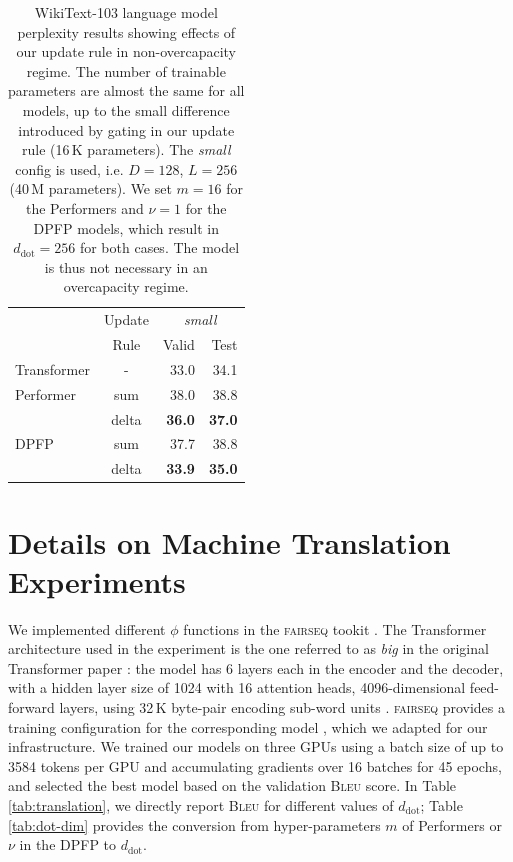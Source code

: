 \documentclass{article}
\theoremstyle{definition}
\begin{document}
\begin{table}[h]
\caption{WikiText-103 language model perplexity results
showing effects of our update rule
in non-overcapacity regime.
The number of trainable parameters are almost the same for all models,
up to the small difference introduced by gating in our update rule (16\,K parameters).
The \textit{small} config is used, i.e. $D=128$, $L=256$ (40\,M parameters).
We set $m=16$ for the Performers and $\nu=1$ for the DPFP models,
which result in $d_\text{dot} = 256$ for both cases.
The model is thus not necessary in an overcapacity regime.  
}
\label{tab:lm_non_overcap}
\vskip 0.15in
\begin{center}
\begin{small}
\begin{tabular}{l|c|rr}
\toprule
     &  Update  & \multicolumn{2}{c}{\textit{small}}  \\
          &  Rule  & \multicolumn{1}{r}{Valid} & \multicolumn{1}{r}{Test}  \\ \midrule
Transformer   &   -      &  33.0  &  34.1 \\ \midrule
Performer &   sum    & 38.0   & 38.8 \\
          &  delta    & \textbf{36.0}  &  \textbf{37.0} \\ \midrule
DPFP &   sum    &  37.7  & 38.8   \\
          &  delta    &  \textbf{33.9}  & \textbf{35.0}  \\
\bottomrule
\end{tabular}
\end{small}
\end{center}
\vskip -0.1in

\end{table}

\section{Details on Machine Translation Experiments}
\label{app:mt}
We implemented different $\phi$ functions in the \textsc{fairseq} tookit \cite{OttEBFGNGA19}.
The Transformer architecture used in the experiment
is the one referred to as \textit{big} in the original Transformer paper \cite{trafo}:
the model has 6 layers each in the encoder and the decoder, with a hidden layer size of 1024
with 16 attention heads, 4096-dimensional feed-forward layers,
using 32\,K byte-pair encoding sub-word units \cite{sennrich16bpe}.
\textsc{fairseq} provides a training configuration for the corresponding model \cite{ott2018},
which we adapted for our infrastructure.
We trained our models on three GPUs using a batch size of up to 3584 tokens per GPU
and accumulating gradients over 16 batches for 45 epochs, and selected the best model
based on the validation \textsc{Bleu} score.
In Table \ref{tab:translation}, we directly report \textsc{Bleu} for different values of $d_\text{dot}$;
Table \ref{tab:dot-dim} provides the conversion from hyper-parameters $m$ of Performers or $\nu$ in the DPFP to $d_\text{dot}$.
\end{document}
